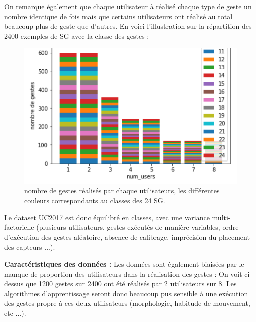 \documentclass[12pt,a4paper,roman]{article}
\begin{document}
\newpage
On remarque également que chaque utilisateur à réalisé chaque type de geste un nombre identique de fois mais que certains utilisateurs ont réalisé au total beaucoup plus de geste que d'autres. En voici l'illustration sur la répartition des 2400 exemples de SG avec la classe des gestes :

\begin{figure}[h!]
\centering
\includegraphics[scale=0.5]{comptage.png}
\caption{nombre de gestes réalisés par chaque utilisateurs, les différentes couleurs correspondants au classes des 24 SG.}
\label{fig:universe}
\end{figure}

Le dataset UC2017 est donc équilibré en classes, avec une variance multi-factorielle (plusieurs utilisateurs, gestes exécutés de manière variables, ordre d'exécution des gestes aléatoire, absence de calibrage, imprécision du placement des capteurs ...). 
\newline

\textbf{Caractéristiques des données :}
Les données sont également biaisées par le manque de proportion des utilisateurs dans la réalisation des gestes : On voit ci-dessus que 1200 gestes sur 2400 ont été réalisés par 2 utilisateurs sur 8. Les algorithmes d'apprentissage seront donc beaucoup pus sensible à une exécution des gestes propre à ces deux utilisateurs (morphologie, habitude de mouvement, etc ...).
\end{document}

